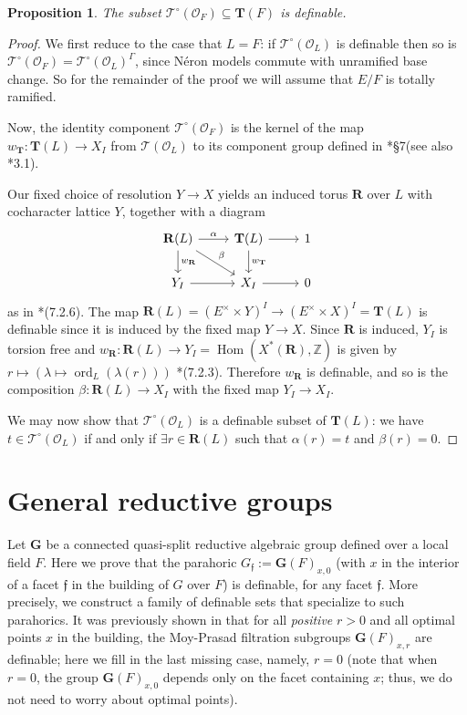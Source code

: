 \documentclass{amsart}
\newcommand{\Z}{{\mathbb Z}}
\newcommand{\ri}{\mathcal{O}}
\newcommand{\bG}{\mathbf{G}}
\newcommand{\bT}{\mathbf {T}}
\newcommand{\bR}{\mathbf{R}}
\newcommand{\ff}{{\mathfrak f}}
\newcommand{\Ner}[1]{\mathcal{#1}}
\newcommand{\NerC}[1]{\mathcal{#1}^\circ}
\DeclareMathOperator{\ord}{ord}
\DeclareMathOperator{\Hom}{Hom}
\theoremstyle{plain}
\newtheorem{prop}[thm]{Proposition}
\theoremstyle{definition}
\begin{document}
\begin{prop} \label{prop:NerCdefinable}
The subset $\NerC{T}(\ri_F) \subseteq \bT(F)$ is definable.
\end{prop}
\begin{proof}
We first reduce to the case that $L = F$: if $\NerC{T}(\ri_L)$ is definable then so is $\NerC{T}(\ri_F) = \NerC{T}(\ri_L)^\Gamma$, since N\'eron models commute with unramified base change.  So for the remainder of the proof we will assume that $E/F$ is totally ramified.

Now, the identity component $\NerC{T}(\ri_F)$ is the kernel of the map $w_\bT : \bT(L) \to X_I$ from $\Ner{T}(\ri_L)$ to its component group  defined in \cite{kottwitz:isocrystals-2}*{\S 7}(see also \cite{bitan}*{3.1}).

Our fixed choice of resolution $Y \to X$ yields an induced torus $\bR$ over $L$ with cocharacter lattice $Y$, together with a diagram
\[
\begin{tikzcd}
\bR(L) \rar{\alpha} \dar{w_{\bR}} \drar{\beta} & \bT(L) \rar \dar{w_{\bT}} & 1 \\
Y_I \rar & X_I \rar & 0
\end{tikzcd}
\]
as in \cite{kottwitz:isocrystals-2}*{(7.2.6)}.  The map $\bR(L) = (E^\times \times Y)^I \to (E^\times \times X)^I = \bT(L)$
is definable since it is induced by the fixed map $Y \to X$.  Since $\bR$ is induced,
$Y_I$ is torsion free and $w_\bR : \bR(L) \to Y_I = \Hom(X^\ast(\bR), \Z)$ is given by
$r \mapsto \left(\lambda \mapsto \ord_{L}(\lambda(r))\right)$ \cite{kottwitz:isocrystals-2}*{(7.2.3)}.
Therefore $w_\bR$ is definable, and so is the composition $\beta : \bR(L) \to X_I$ with the fixed map $Y_I \to X_I$.

We may now show that $\NerC{T}(\ri_L)$ is a definable subset of $\bT(L)$: we have $t \in \NerC{T}(\ri_L)$ if and only if $\exists r \in \bR(L)$ such that $\alpha(r) = t$ and $\beta(r) = 0$.
\end{proof}

\section{General reductive groups}
Let $\bG$ be a connected quasi-split reductive algebraic group defined over a local field $F$. 
Here we prove that the parahoric ${G}_{\ff}:={\bG}(F)_{x, 0}$ (with $x$ in the interior of a facet $\ff$ in the building of $G$ over $F$)   is definable, for  any facet $\ff$. More precisely, we construct a family of definable sets that specialize to such parahorics.  
It was previously shown in \cite{CGH-2} that for all \emph{positive} $r>0$ and all {optimal} points $x$ in the building, the Moy-Prasad filtration subgroups ${\bG}(F)_{x, r}$ are definable; here we fill in the last missing case, namely, $r=0$ (note that when $r=0$, the group ${\bG}(F)_{x,0}$ depends only on the facet containing $x$; thus, we do not need to worry about optimal points).
\end{document}
